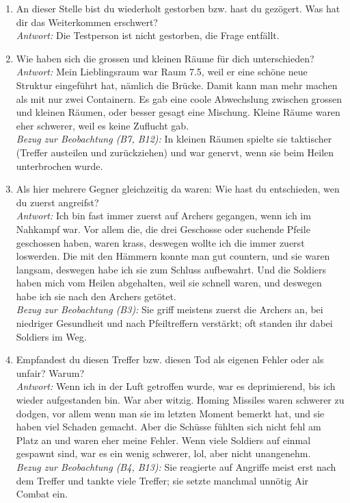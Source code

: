 \documentclass[../Main.tex]{subfiles}
\begin{document}
\begin{enumerate}[label=\textbf{I\arabic*}, leftmargin=1.5cm, itemsep=1em]
\item An dieser Stelle bist du wiederholt gestorben bzw. hast du gezögert. Was hat dir das Weiterkommen erschwert? \\
    \textit{Antwort:} Die Testperson ist nicht gestorben, die Frage entfällt.

\item Wie haben sich die grossen und kleinen Räume für dich unterschieden? \\
    \textit{Antwort:} Mein Lieblingsraum war Raum 7.5, weil er eine schöne neue Struktur eingeführt hat, nämlich die Brücke. Damit kann man mehr machen als mit nur zwei Containern. Es gab eine coole Abwechslung zwischen grossen und kleinen Räumen, oder besser gesagt eine Mischung. Kleine Räume waren eher schwerer, weil es keine Zuflucht gab. \\
    \textit{Bezug zur Beobachtung (B7, B12):} In kleinen Räumen spielte sie taktischer (Treffer austeilen und zurückziehen) und war genervt, wenn sie beim Heilen unterbrochen wurde.

\item Als hier mehrere Gegner gleichzeitig da waren: Wie hast du entschieden, wen du zuerst angreifst? \\
    \textit{Antwort:} Ich bin fast immer zuerst auf Archers gegangen, wenn ich im Nahkampf war. Vor allem die, die drei Geschosse oder suchende Pfeile geschossen haben, waren krass, deswegen wollte ich die immer zuerst loswerden. Die mit den Hämmern konnte man gut countern, und sie waren langsam, deswegen habe ich sie zum Schluss aufbewahrt. Und die Soldiers haben mich vom Heilen abgehalten, weil sie schnell waren, und deswegen habe ich sie nach den Archers getötet. \\
    \textit{Bezug zur Beobachtung (B3):} Sie griff meistens zuerst die Archers an, bei niedriger Gesundheit und nach Pfeiltreffern verstärkt; oft standen ihr dabei Soldiers im Weg.

\item Empfandest du diesen Treffer bzw. diesen Tod als eigenen Fehler oder als unfair? Warum? \\
    \textit{Antwort:} Wenn ich in der Luft getroffen wurde, war es deprimierend, bis ich wieder aufgestanden bin. War aber witzig. Homing Missiles waren schwerer zu dodgen, vor allem wenn man sie im letzten Moment bemerkt hat, und sie haben viel Schaden gemacht. Aber die Schüsse fühlten sich nicht fehl am Platz an und waren eher meine Fehler. Wenn viele Soldiers auf einmal gespawnt sind, war es ein wenig schwerer, lol, aber nicht unangenehm. \\
    \textit{Bezug zur Beobachtung (B4, B13):} Sie reagierte auf Angriffe meist erst nach dem Treffer und tankte viele Treffer; sie setzte manchmal unnötig Air Combat ein.


\end{enumerate}
\end{document}
